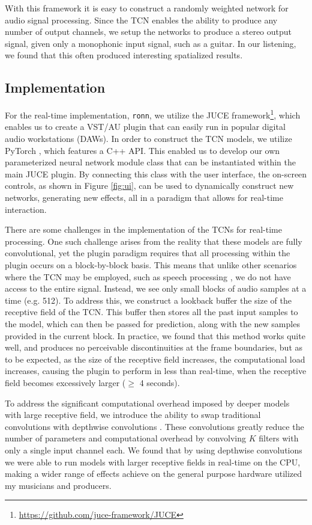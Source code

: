 \documentclass{article}
\begin{document}
With this framework it is easy to construct a randomly weighted network for audio signal processing.
Since the TCN enables the ability to produce any number of output channels, 
we setup the networks to produce a stereo output signal, given only a monophonic input signal, such as a guitar. 
In our listening, we found that this often produced interesting spatialized results. 

\subsection{Implementation}
For the real-time implementation, \texttt{ronn}, we utilize the JUCE framework\footnote{\url{https://github.com/juce-framework/JUCE}},
which enables us to create a VST/AU plugin that can easily run in popular digital audio workstations (DAWs).
In order to construct the TCN models, we utilize PyTorch \cite{pytorch}, which features a C++ API. 
This enabled us to develop our own parameterized neural network module class that can be instantiated within the main JUCE plugin.
By connecting this class with the user interface, the on-screen controls, as shown in Figure \ref{fig:ui},
can be used to dynamically construct new networks, generating new effects, all in a paradigm that allows for real-time interaction. 

There are some challenges in the implementation of the TCNs for real-time processing.
One such challenge arises from the reality that these models are fully convolutional,
yet the plugin paradigm requires that all processing within the plugin occurs on a block-by-block basis. 
This means that unlike other scenarios where the TCN may be employed, such as speech processing \cite{}, 
we do not have access to the entire signal. Instead, we see only small blocks of audio samples at a time (e.g. 512).
To address this, we construct a lookback buffer the size of the receptive field of the TCN. 
This buffer then stores all the past input samples to the model, which can then be passed for prediction, 
along with the new samples provided in the current block. 
In practice, we found that this method works quite well, and produces no perceivable discontinuities at the frame boundaries, 
but as to be expected, as the size of the receptive field increases, the computational load increases, 
causing the plugin to perform in less than real-time, when the receptive field becomes excessively larger ($\geq$ 4 seconds).

To address the significant computational overhead imposed by deeper models with large receptive field, 
we introduce the ability to swap traditional convolutions with depthwise convolutions \cite{howard2017mobilenets}.
These convolutions greatly reduce the number of parameters and computational overhead by convolving $K$ filters
with only a single input channel each. 
We found that by using depthwise convolutions we were able to run models with larger receptive fields in real-time on the CPU,
making a wider range of effects achieve on the general purpose hardware utilized my musicians and producers. 
\end{document}
